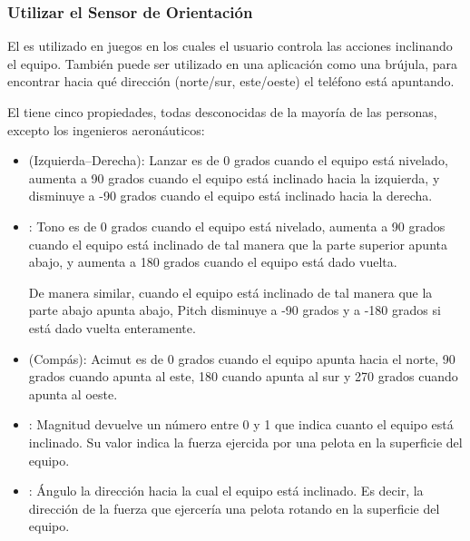 \subsubsection*{Utilizar el Sensor de Orientación}

El  es utilizado en juegos en los
cuales el usuario controla las acciones inclinando el equipo. También
puede ser utilizado en una aplicación como una brújula, para encontrar
hacia qué dirección (norte/sur, este/oeste) el teléfono está
apuntando.


El  tiene cinco propiedades, todas
desconocidas de la mayoría de las personas, excepto los ingenieros
aeronáuticos:

\begin{itemize}
\item {} (Izquierda--Derecha): Lanzar es de 0 grados
  cuando el equipo está nivelado, aumenta a 90 grados cuando el equipo
  está inclinado hacia la izquierda, y disminuye a -90 grados cuando
  el equipo está inclinado hacia la derecha.

\item {}: Tono es de 0 grados cuando el equipo está
  nivelado, aumenta a 90 grados cuando el equipo está inclinado de tal
  manera que la parte superior apunta abajo, y aumenta a 180 grados
  cuando el equipo está dado vuelta.

  De manera similar, cuando el equipo está inclinado de tal manera que
  la parte abajo apunta abajo, Pitch disminuye a -90 grados y a -180
  grados si está dado vuelta enteramente.

\item {} (Compás): Acimut es de 0 grados cuando el
  equipo apunta hacia el norte, 90 grados cuando apunta al este, 180
  cuando apunta al sur y 270 grados cuando apunta al oeste.

\item {}: Magnitud devuelve un número entre 0 y 1 que
  indica cuanto el equipo está inclinado. Su valor indica la fuerza
  ejercida por una pelota en la superficie del equipo.

\item {}: Ángulo la dirección hacia la cual el equipo
  está inclinado. Es decir, la dirección de la fuerza que ejercería
  una pelota rotando en la superficie del equipo.

\end{itemize}

